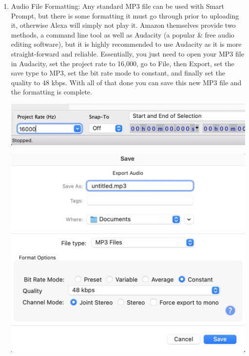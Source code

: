 \documentclass[11pt, oneside]{article}
\begin{document}
\begin{enumerate}
  \item Audio File Formatting: 
  Any standard MP3 file can be used with Smart Prompt, but there is some formatting it must go through prior to uploading it, otherwise Alexa will simply not play it. Amazon themselves provide two methods, a command line tool as well as Audacity (a popular \& free audio editing software), but it is highly recommended to use Audacity as it is more straight-forward and reliable. Essentially, you just need to open your MP3 file in Audacity, set the project rate to 16,000, go to File, then Export, set the save type to MP3, set the bit rate mode to constant, and finally set the quality to 48 kbps. With all of that done you can save this new MP3 file and the formatting is complete.
\begin{center}
  \includegraphics[width=\linewidth * 3/4]{images/audacityProjectRate.png}
\end{center}
\begin{center}
  \includegraphics[width=\linewidth * 1/2]{images/audacityExportSettings.png}
\end{center}
  

\end{enumerate}
\end{document}
